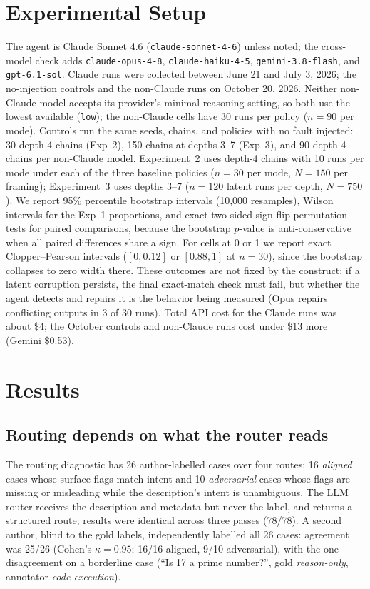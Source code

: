 \documentclass[11pt,a4paper]{article}
\begin{document}
\section{Experimental Setup}
\label{sec:setup}
The agent is Claude Sonnet 4.6 (\texttt{claude-sonnet-4-6}) unless noted; the
cross-model check adds \texttt{claude-opus-4-8}, \texttt{claude-haiku-4-5},
\texttt{gemini-3.8-flash}, and \texttt{gpt-6.1-sol}. Claude runs were collected
between June 21 and July 3, 2026; the no-injection controls and the non-Claude
runs on October 20, 2026. Neither non-Claude model accepts its provider's
minimal reasoning setting, so both use the lowest available (\texttt{low});
the non-Claude cells have 30 runs per policy ($n{=}90$ per mode). Controls
run the same seeds, chains, and policies with no fault injected: 30 depth-4
chains (Exp~2), 150 chains at depths 3--7 (Exp~3), and 90 depth-4 chains per
non-Claude model. Experiment~2 uses depth-4
chains with 10 runs per mode under each of the three baseline policies
($n{=}30$ per mode, $N{=}150$ per framing); Experiment~3 uses depths 3--7
($n{=}120$ latent runs per depth, $N{=}750$). We report 95\% percentile
bootstrap intervals (10{,}000 resamples), Wilson intervals for the Exp~1
proportions, and exact two-sided sign-flip permutation tests for paired
comparisons, because the bootstrap $p$-value is anti-conservative when all
paired differences share a sign. For cells at 0 or 1 we report exact
Clopper--Pearson intervals ($[0, 0.12]$ or $[0.88, 1]$ at $n{=}30$), since the
bootstrap collapses to zero width there. These outcomes are not fixed by the
construct: if a latent corruption persists, the final exact-match check must
fail, but whether the agent detects and repairs it is the behavior being
measured (Opus repairs conflicting outputs in 3 of 30 runs). Total API cost
for the Claude runs was about \$4; the October controls and non-Claude runs
cost under \$13 more (Gemini \$0.53).

\section{Results}
\label{sec:results}

\subsection{Routing depends on what the router reads}
\label{sec:exp1}
The routing diagnostic has 26 author-labelled cases over four routes: 16
\emph{aligned} cases whose surface flags match intent and 10 \emph{adversarial}
cases whose flags are missing or misleading while the description's intent is
unambiguous. The LLM router receives the description and metadata but never the
label, and returns a structured route; results were identical across three
passes (78/78). A second author, blind to the gold labels, independently
labelled all 26 cases: agreement was 25/26 (Cohen's $\kappa{=}0.95$; 16/16
aligned, 9/10 adversarial), with the one disagreement on a borderline case
(``Is 17 a prime number?'', gold \emph{reason-only}, annotator
\emph{code-execution}).
\end{document}

